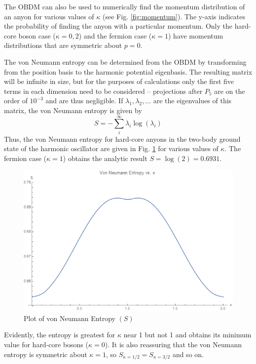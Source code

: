 \documentclass[onecolumn,english,aps,pra]{revtex4}
\begin{document}
The OBDM can also be used to numerically find the momentum distribution of an anyon for various values of $\kappa$ (see Fig. \ref{fig:momentum}). The y-axis indicates the probability of finding the anyon with a particular momentum. Only the hard-core boson case ($\kappa = 0, 2$) and the fermion case ($\kappa = 1$) have momentum distributions that are symmetric about $p = 0$.

The von Neumann entropy can be determined from the OBDM by transforming from the position basis to the harmonic potential eigenbasis. The resulting matrix will be infinite in size, but for the purposes of calculations only the first five terms in each dimension need to be considered -- projections after $P_5$ are on the order of $10^{-3}$ and are thus negligible. If $\lambda_1, \lambda_2,\ldots$ are the eigenvalues of this matrix, the von Neumann entropy is given by
\[ S =  -\sum_i^\infty \lambda_i \log(\lambda_i) \]
Thus, the von Neumann entropy for hard-core anyons in the two-body ground state of the harmonic oscillator are given in Fig. \ref{fig:entropy} for various values of $\kappa$. The fermion case ($\kappa = 1$) obtains the analytic result $S = \log(2) = 0.6931$. 

\begin{figure}[h]
\includegraphics[scale=.5]{"../Plots/EntropyPlot"}
\caption{Plot of von Neumann Entropy $(S)$}
\label{fig:entropy}
\end{figure}

Evidently, the entropy is greatest for $\kappa$ near 1 but not 1 and obtains its minimum value for hard-core bosons ($\kappa = 0$). It is also reassuring that the von Neumann entropy is symmetric about $\kappa = 1$, so $S_{\kappa = 1/2} = S_{\kappa = 3/2}$ and so on.
\end{document}
